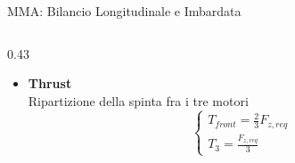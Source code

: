 \documentclass[aspectratio=169]{beamer} %
\begin{document}
\begin{frame}{MMA: Bilancio Longitudinale e Imbardata}
    \begin{columns}[T]
        \begin{column}{0.43\textwidth}
            \begin{itemize}
                \item \textbf{Thrust}\\
            Ripartizione della spinta fra i tre motori
            \begin{equation}
                \begin{cases}
                    T_{front} = \frac{2}{3}F_{z,req}\\
                    T_{3} = \frac{F_{z,req}}{3}
                \end{cases} 
            \end{equation}


\end{itemize}
\end{column}
\end{columns}
\end{frame}
\end{document}
